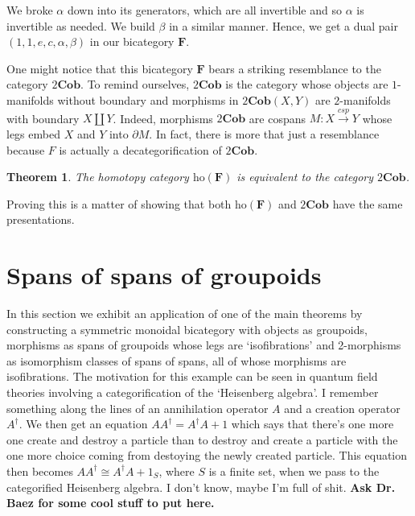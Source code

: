 \documentclass[11pt]{amsart}
\newcommand{\cat}[1]{\mathbf{#1}}
\newcommand{\from}{\colon}
\newcommand{\tocospan}{\xrightarrow{\mathit{csp}}}
\newtheorem{thm}{Theorem}[section]
\theoremstyle{remark}
\theoremstyle{definition}
\begin{document}
We broke $\alpha$ down into its generators, which are all invertible and so $\alpha$ is invertible as needed.  We build $\beta$ in a similar manner.  Hence, we get a dual pair $(1,1,e,c,\alpha,\beta)$ in our bicategory $\cat{F}$.  

One might notice that this bicategory $\cat{F}$ bears a striking resemblance to the category $2\cat{Cob}$.  To remind ourselves, $2\cat{Cob}$ is the category whose objects are $1$-manifolds without boundary and morphisms in $2\cat{Cob}(X,Y)$ are $2$-manifolds with boundary $X \coprod Y$.  Indeed, morphisms $2\cat{Cob}$ are cospans $M \from X \tocospan Y$ whose legs embed $X$ and $Y$ into $\partial M$.  In fact, there is more that just a resemblance because $F$ is actually a decategorification of $2\cat{Cob}$.  

\begin{thm}
	The homotopy category $\text{ho}(\cat{F})$ is equivalent to the category $2\cat{Cob}$. 
\end{thm}

Proving this is a matter of showing that both $\text{ho}(\cat{F})$ and $2\cat{Cob}$ have the same presentations.  

\section{Spans of spans of groupoids}
In this section we exhibit an application of one of the main theorems by constructing a symmetric monoidal bicategory with objects as groupoids, morphisms as spans of groupoids whose legs are `isofibrations' and 2-morphisms as isomorphism classes of spans of spans, all of whose morphisms are isofibrations. The motivation for this example can be seen in quantum field theories involving a categorification of the `Heisenberg algebra'. I remember something along the lines of an annihilation operator $A$ and a creation operator $A^\dagger$. We then get an equation $AA^\dagger = A^\dagger A+1$ which says that there's one more one create and destroy a particle than to destroy and create a particle with the one more choice coming from destoying the newly created particle. This equation then becomes $AA^\dagger \cong A^\dagger A + 1_{S}$, where $S$ is a finite set, when we pass to the categorified Heisenberg algebra. I don't know, maybe I'm full of shit. \textbf{Ask Dr. Baez for some cool stuff to put here.} 
\end{document}
